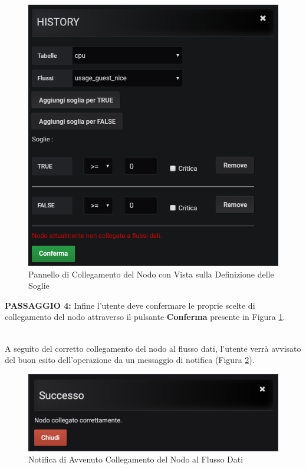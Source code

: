 \begin{figure}[H]
	\begin{center}
		\includegraphics[scale=0.65]{./images/PannelloSoglie.png}
		 \caption{Pannello di Collegamento del Nodo con Vista sulla Definizione delle Soglie}	
		 \label{PannelloSoglie}
	\end{center}
\end{figure}

\textbf{PASSAGGIO 4:} Infine l'utente deve confermare le proprie scelte di collegamento del nodo attraverso il pulsante \textbf{Conferma} presente in Figura \ref{PannelloSoglie}.

~\\
A seguito del corretto collegamento del nodo al flusso dati, l'utente verrà avvisato del buon esito dell'operazione da un messaggio di notifica (Figura \ref{NotificaCollegamento}).

\begin{figure}[H]
	\begin{center}
		\includegraphics[scale=0.6]{./images/NotificaCollegamento.png}
		 \caption{Notifica di Avvenuto Collegamento del Nodo al Flusso Dati}	
		 \label{NotificaCollegamento}
	\end{center}
\end{figure}


